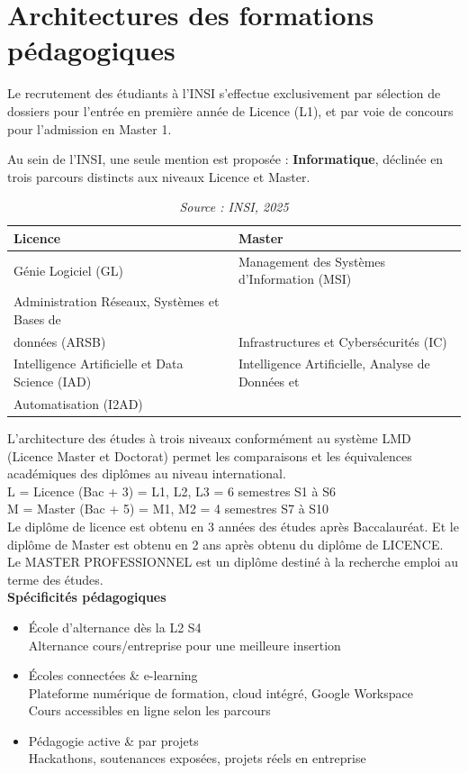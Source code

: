 \documentclass[a4paper,12pt]{article}
\begin{document}
\section{Architectures des formations pédagogiques}

Le recrutement des étudiants à l’INSI s’effectue exclusivement par sélection de dossiers pour l’entrée en première année de Licence (L1), et par voie de concours pour l’admission en Master 1.

Au sein de l’INSI, une seule mention est proposée : \textbf{Informatique}, déclinée en trois parcours distincts aux niveaux Licence et Master.


\begin{table}[H]
\centering
\begin{tabular}{|l|l|}
\hline
\textbf{Licence} & \textbf{Master} \\
\hline
Génie Logiciel (GL) & Management des Systèmes d’Information (MSI) \\
\hline
Administration Réseaux, Systèmes et Bases de \\données (ARSB) & Infrastructures et Cybersécurités (IC) \\
\hline
Intelligence Artificielle et Data Science (IAD) & Intelligence Artificielle, Analyse de Données et \\Automatisation (I2AD) \\
\hline
\end{tabular}
\caption{Parcours Licence et Master proposés à l’INSI}
\caption*{\textit{Source : INSI, 2025}}
\label{tab:parcours}
\end{table} 

L’architecture des études à trois niveaux conformément au système LMD (Licence Master et Doctorat) permet les comparaisons et les équivalences académiques des diplômes au niveau international.\\
L = Licence (Bac + 3) = L1, L2, L3 = 6 semestres S1 à S6\\
M = Master (Bac + 5) = M1, M2 = 4 semestres S7 à S10\\
Le diplôme de licence est obtenu en 3 années des études après Baccalauréat. Et le diplôme de Master est obtenu en 2 ans après obtenu du diplôme de LICENCE.\\
Le MASTER PROFESSIONNEL est un diplôme destiné à la recherche emploi au terme des études.\\

\textbf{Spécificités pédagogiques} 
\begin{itemize}
    \item École d'alternance dès la L2 S4\\
    Alternance cours/entreprise pour une meilleure insertion
    \item Écoles connectées \& e-learning\\
    Plateforme numérique de formation, cloud intégré, Google Workspace\\
    Cours accessibles en ligne selon les parcours
    \item Pédagogie active \& par projets\\
    Hackathons, soutenances exposées, projets réels en entreprise
\end{itemize}
\end{document}
